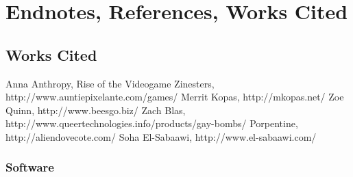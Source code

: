
\chapter{Endnotes, References, Works Cited} %

\label{Chapter6} %



\section{Works Cited}


Anna Anthropy, Rise of the Videogame Zinesters, http://www.auntiepixelante.com/games/
Merrit Kopas, http://mkopas.net/
Zoe Quinn, http://www.beesgo.biz/
Zach Blas, http://www.queertechnologies.info/products/gay-bombs/
Porpentine, http://aliendovecote.com/
Soha El-Sabaawi, http://www.el-sabaawi.com/

\subsection{Software}
